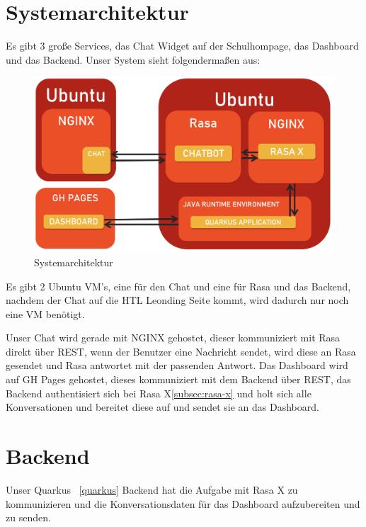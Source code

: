 \section{Systemarchitektur}\label{sec:systemarchitektur}

Es gibt 3 große Services, das Chat Widget auf der Schulhompage, das Dashboard und das Backend.
Unser System sieht folgendermaßen aus:

\begin{figure}[hbt!]
    \centering
    \includegraphics[scale=0.2]{pics/systemarchitektur}
    \caption{Systemarchitektur}
    \label{fig:impl:architektur}
\end{figure}

Es gibt 2 Ubuntu VM's, eine für den Chat und eine für Rasa und das Backend, nachdem der Chat auf die HTL Leonding Seite kommt, wird dadurch nur noch eine VM benötigt.

Unser Chat wird gerade mit NGINX gehostet, dieser kommuniziert mit Rasa direkt über REST, wenn der Benutzer eine Nachricht sendet, wird diese an Rasa gesendet und Rasa antwortet mit der passenden Antwort.
Das Dashboard wird auf GH Pages gehostet, dieses kommuniziert mit dem Backend über REST, das Backend authentisiert sich bei Rasa X\ref{subsec:rasa-x} und holt sich alle Konversationen und bereitet diese auf und sendet sie an das Dashboard.

\section{Backend}\label{sec:backend}

Unser Quarkus ~\ref{quarkus} Backend hat die Aufgabe mit Rasa X zu kommunizieren und die Konversationsdaten für das Dashboard aufzubereiten und zu senden.

